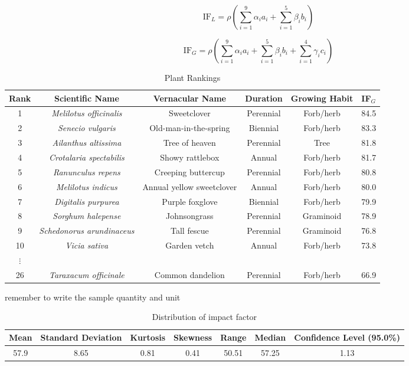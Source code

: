 \documentclass[12pt]{article}
\begin{document}
		\begin{equation}
			\mathrm{IF}_L = \rho \left( \sum_{i = 1}^9 \alpha_ia_i + \sum_{i = 1}^5 \beta_ib_i \right)
		\end{equation}
		
		\begin{equation}
			\mathrm{IF}_G = \rho \left( \sum_{i = 1}^9 \alpha_ia_i + \sum_{i = 1}^5 \beta_ib_i + \sum_{i = 1}^4 \gamma_ic_i \right)
		\end{equation}
		
		{
			\fontsize{10}{14}\selectfont
			{
				\begin{longtable}{cccccc}
					\caption{Plant Rankings}
					\label{tb:ranks}\\
					
					\toprule
					Rank&Scientific Name&Vernacular Name&Duration&Growing Habit&IF$_G$\\
					\toprule
					1&\textit{Melilotus officinalis}&Sweetclover&Perennial&Forb/herb&84.5\\
					2&\textit{Senecio vulgaris}&Old-man-in-the-spring&Biennial&Forb/herb&83.3\\
					3&\textit{Ailanthus altissima}&Tree of heaven&Perennial&Tree&81.8\\
					4&\textit{Crotalaria spectabilis}&Showy rattlebox&Annual&Forb/herb&81.7\\
					5&\textit{Ranunculus repens}&Creeping buttercup&Perennial&Forb/herb&80.8\\
					6&\textit{Melilotus indicus}&Annual yellow sweetclover&Annual&Forb/herb&80.0\\
					7&\textit{Digitalis purpurea}&Purple foxglove&Biennial&Forb/herb&79.9\\
					8&\textit{Sorghum halepense}&Johnsongrass&Perennial&Graminoid&78.9\\
					9&\textit{Schedonorus arundinaceus}&Tall fescue&Perennial&Graminoid&76.8\\
					10&\textit{Vicia sativa}&Garden vetch&Annual&Forb/herb&73.8\\
					$\vdots$\\
					26&\textit{Taraxacum officinale}&Common dandelion&Perennial&Forb/herb&66.9\\
					\bottomrule
				\end{longtable}
			}
		}
		
		remember to write the sample quantity and unit \\

		{
			\fontsize{10}{14}\selectfont
			{
				\begin{longtable}{ccccccc}
					\caption{Distribution of impact factor}
					\label{tb:IFDistribution}\\
					
					\toprule
					Mean&Standard Deviation&Kurtosis&Skewness&Range&Median&Confidence Level (95.0\%)\\
					\toprule
					57.9&8.65&0.81&0.41&50.51&57.25&1.13\\
					\bottomrule
				\end{longtable}
			}
		}
		
\end{document}
